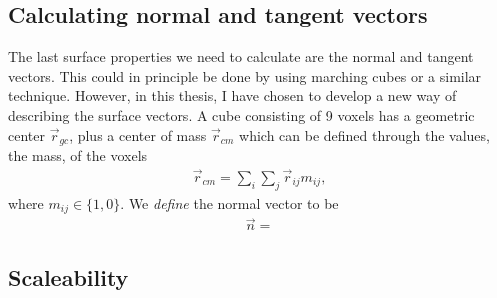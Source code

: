 \subsection{Calculating normal and tangent vectors}
The last surface properties we need to calculate are the normal and tangent vectors. This could in principle be done by using marching cubes \cite{article:marching_cubes_original} or a similar technique. However, in this thesis, I have chosen to develop a new way of describing the surface vectors. A cube consisting of 9 voxels has a geometric center $\vec r_{gc}$, plus a center of mass $\vec r_{cm}$ which can be defined through the values, the mass, of the voxels
\begin{align}
	\vec r_{cm} = \sum_i\sum_j \vec r_{ij}m_{ij},
\end{align}
where $m_{ij} \in \{1,0\}$. We \textit{define} the normal vector to be 
\begin{align}
	\vec n = 
\end{align}
\subsection{Scaleability}